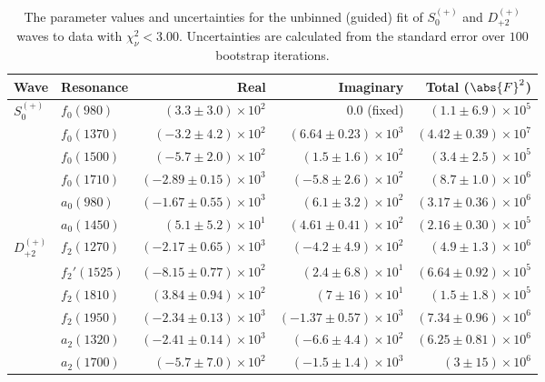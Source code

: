 \begin{table}[ht]
    \begin{center}
        \begin{tabular}{llrrr}\toprule
        Wave & Resonance & Real & Imaginary & Total ($\abs{F}^2$) \\\midrule
$S_{0}^{(+)}$ & $f_{0}(980)$ & $(3.3 \pm 3.0) \times 10^{2}$ & $0.0$ (fixed) & $(1.1 \pm 6.9) \times 10^{5}$ \\
 & $f_{0}(1370)$ & $(-3.2 \pm 4.2) \times 10^{2}$ & $(6.64 \pm 0.23) \times 10^{3}$ & $(4.42 \pm 0.39) \times 10^{7}$ \\
 & $f_{0}(1500)$ & $(-5.7 \pm 2.0) \times 10^{2}$ & $(1.5 \pm 1.6) \times 10^{2}$ & $(3.4 \pm 2.5) \times 10^{5}$ \\
 & $f_{0}(1710)$ & $(-2.89 \pm 0.15) \times 10^{3}$ & $(-5.8 \pm 2.6) \times 10^{2}$ & $(8.7 \pm 1.0) \times 10^{6}$ \\
 & $a_{0}(980)$ & $(-1.67 \pm 0.55) \times 10^{3}$ & $(6.1 \pm 3.2) \times 10^{2}$ & $(3.17 \pm 0.36) \times 10^{6}$ \\
 & $a_{0}(1450)$ & $(5.1 \pm 5.2) \times 10^{1}$ & $(4.61 \pm 0.41) \times 10^{2}$ & $(2.16 \pm 0.30) \times 10^{5}$ \\
$D_{+2}^{(+)}$ & $f_{2}(1270)$ & $(-2.17 \pm 0.65) \times 10^{3}$ & $(-4.2 \pm 4.9) \times 10^{2}$ & $(4.9 \pm 1.3) \times 10^{6}$ \\
 & $f_{2}'(1525)$ & $(-8.15 \pm 0.77) \times 10^{2}$ & $(2.4 \pm 6.8) \times 10^{1}$ & $(6.64 \pm 0.92) \times 10^{5}$ \\
 & $f_{2}(1810)$ & $(3.84 \pm 0.94) \times 10^{2}$ & $(7 \pm 16) \times 10^{1}$ & $(1.5 \pm 1.8) \times 10^{5}$ \\
 & $f_{2}(1950)$ & $(-2.34 \pm 0.13) \times 10^{3}$ & $(-1.37 \pm 0.57) \times 10^{3}$ & $(7.34 \pm 0.96) \times 10^{6}$ \\
 & $a_{2}(1320)$ & $(-2.41 \pm 0.14) \times 10^{3}$ & $(-6.6 \pm 4.4) \times 10^{2}$ & $(6.25 \pm 0.81) \times 10^{6}$ \\
 & $a_{2}(1700)$ & $(-5.7 \pm 7.0) \times 10^{2}$ & $(-1.5 \pm 1.4) \times 10^{3}$ & $(3 \pm 15) \times 10^{6}$ \\\bottomrule
        \end{tabular}
    \caption{The parameter values and uncertainties for the unbinned (guided) fit of $S_{0}^{(+)}$ and $D_{+2}^{(+)}$ waves to data with $\chi^2_\nu < 3.00$. Uncertainties are calculated from the standard error over $100$ bootstrap iterations.}\label{tab:unbinned-fit-chisqdof-3.0-guided-Sp0p-Dp2p}
    \end{center}
\end{table}
